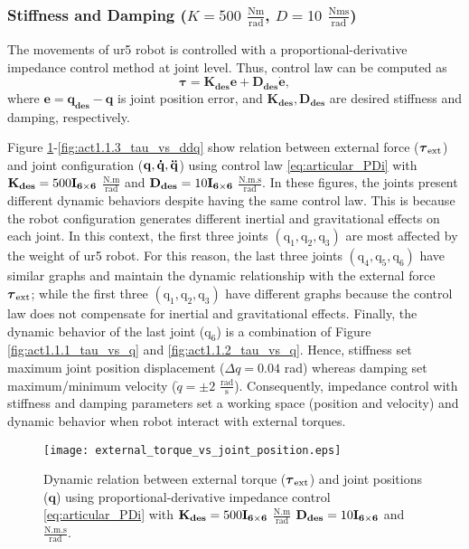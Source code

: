 \graphicspath{{images/act_1.1.3/}}
\subsubsection{Stiffness and  Damping ($K=500$ $\mathrm{\frac{Nm}{rad}}$, $D=10$ $\mathrm{\frac{Nms}{rad}}$)}
The movements of ur5 robot is controlled with a proportional-derivative impedance control method at joint level. Thus, control law can be computed as 
\begin{equation}
	\boldsymbol{\tau}
	= \mathbf{K_{des} e} + \mathbf{D_{des} \dot{e}},
	\label{eq:articular_PDi}
\end{equation}
\noindent where $\mathbf{e}=\mathbf{q_{des} - q}$ is joint position error, and $\mathbf{K_{des}}, \mathbf{D_{des}}$ are desired stiffness and damping, respectively. 

Figure \ref{fig:act1.1.3_tau_vs_q}-\ref{fig:act1.1.3_tau_vs_ddq} show relation between external force ($\boldsymbol{\tau}_\mathrm{ext}$) and joint configuration ($\mathbf{q, \dot{q}, \ddot{q}}$) using control law \eqref{eq:articular_PDi} with $\mathbf{K_{des}}=500\mathbf{I_{6 \times 6}}$ $\mathrm{\frac{N.m}{rad}}$ and $\mathbf{D_{des}}=10\mathbf{I_{6 \times 6}}$ $\mathrm{\frac{N.m.s}{rad}}$. In these figures, the joints present different dynamic behaviors despite having the same control law. This is because the robot configuration generates different inertial and gravitational effects on each joint. In this context, the first three joints $(\mathrm{q_1, q_2, q_3})$ are most affected by the weight of ur5 robot. For this reason, the last three joints $(\mathrm{q_4, q_5, q_6})$ have similar graphs and maintain the dynamic relationship with the external force $\boldsymbol{\tau}_\mathrm{ext}$; while the first three $(\mathrm{q_1, q_2, q_3})$ have different graphs because the control law does not compensate for inertial and gravitational effects. Finally, the dynamic behavior of the last joint ($\mathrm{q_6}$) is a combination of Figure \ref{fig:act1.1.1_tau_vs_q} and \ref{fig:act1.1.2_tau_vs_q}. Hence, stiffness set maximum joint position displacement ($\Delta q=0.04$ rad) whereas damping set maximum/minimum velocity ($\dot{q}= \pm 2$ $\mathrm{\frac{rad}{s}}$). Consequently, impedance control with stiffness and damping parameters set a working space (position and velocity) and dynamic behavior when robot interact with external torques. %


\begin{figure}
\centering
\texttt{[image: external\_torque\_vs\_joint\_position.eps]}
\caption{Dynamic relation between external torque ($\boldsymbol{\tau}_\mathrm{ext}$) and joint positions ($\mathbf{q}$) using proportional-derivative impedance control \eqref{eq:articular_PDi} with $\mathbf{K_{des}}=500\mathbf{I_{6 \times 6}}$ $\mathrm{\frac{N.m}{rad}}$ $\mathbf{D_{des}}=10\mathbf{I_{6 \times 6}}$ and $\mathrm{\frac{N.m.s}{rad}}$.}
\label{fig:act1.1.3_tau_vs_q}
\end{figure}

